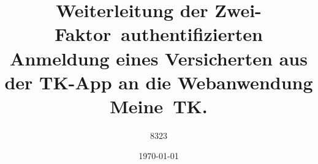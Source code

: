 \documentclass[12pt,oneside,ams,a4paper]{hepthesis}
\author{8323}
\title{Weiterleitung der \mbox{Zwei-Faktor authentifizierten} Anmeldung eines Versicherten aus der TK-App an die Webanwendung Meine~TK.}
\date{\today}
\begin{document}
\newcommand{\theLocationAndDate}{Hamburg, den \thedate}
\newcommand{\inlinecode}[2]{\colorbox{lightgray}{\lstinline[language=#1]$#2$}}
\renewcommand*\chapterheadstartvskip{\vspace*{-1cm}}
\renewcommand*{\figurename}{Abb.}
\renewcommand*{\figureautorefname}{Abb.}
\renewcommand*{\tablename}{Tab.}
\renewcommand*{\tableautorefname}{Tab.}
\renewcommand*{\chapterautorefname}{Kapitel}
\renewcommand*{\sectionautorefname}{Kapitel}
\renewcommand*{\subsectionautorefname}{Kapitel}
\renewcommand*{\equationautorefname}{Gl.}
\let\harvardleftorig\harvardleft
\newcommand\citevgl
  {\def\harvardleft{(vgl.\ \global\let\harvardleft\harvardleftorig}%
   \cite
  }




\newpage
\begin{frontmatter}
    
\end{frontmatter}

\begin{mainmatter}
    
\end{mainmatter}

\begin{appendices}
    
\end{appendices}

\begin{backmatter}
    
\end{backmatter}
\end{document}
